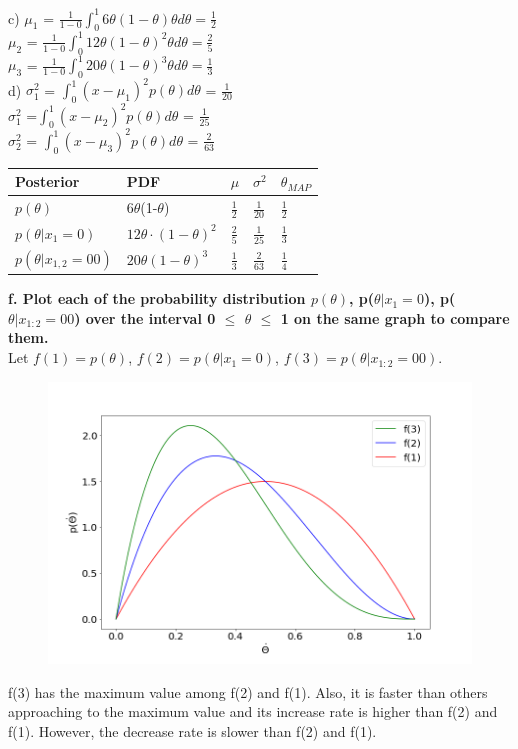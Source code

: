 \documentclass{article}
\begin{document}
c) $\mu_1$ = $\frac{1}{1-0}\int_{0}^{1} 6\theta (1-\theta)\theta d\theta = \frac{1}{2}$\\
$\mu_2$ = $\frac{1}{1-0}\int_{0}^{1} 12\theta (1-\theta)^2 \theta d\theta = \frac{2}{5}$\\
$\mu_3$ = $\frac{1}{1-0}\int_{0}^{1} 20\theta (1-\theta)^3 \theta d\theta = \frac{1}{3}$\\

d) $\sigma^2_1$  = $\int_{0}^{1} (x-\mu_1)^2 p(\theta)d\theta $ = $\frac{1}{20}$\\
$\sigma^2_1$  =$\int_{0}^{1} (x-\mu_2)^2 p(\theta)d\theta $ = $\frac{1}{25}$\\
$\sigma^2_2$ = $\int_{0}^{1} (x-\mu_3)^2 p(\theta)d\theta $ = $\frac{2}{63}$

\begin{table}[]
\centering
\begin{tabular}{|l|l|l|l|l|}

\hline
\textbf{Posterior} & \textbf{PDF} & \textbf{$\mu$} & \textbf{$\sigma^2$} & \textbf{$\theta_{MAP}$} \\ 
\hline
      $p(\theta)$ &  6$\theta$(1-$\theta$)& $\frac{1}{2}$ & $\frac{1}{20}$ & $\frac{1}{2}$ \\
       \hline
      $p(\theta|x_1 = 0)$ & $12\theta\cdot(1-\theta)^2$ & $\frac{2}{5}$ & $\frac{1}{25}$ & $\frac{1}{3}$ \\ 
      \hline
      $p(\theta|x_{1,2} = 00)$ & $20\theta(1-\theta)^3$ & $\frac{1}{3}$ &  $\frac{2}{63}$ &  $\frac{1}{4}$\\
       \hline
\end{tabular}
\end{table}
\textbf{f. Plot each of the probability distribution $p(\theta)$, p($\theta|x_1 = 0$), p($\theta|x_{1:2} =00 $) over the interval 0 $\leq$ $\theta$ $\leq$ 1 on the same graph to compare them.} \\
Let $f(1) = p(\theta)$, $f(2) = p(\theta|x_1 = 0)$, $f(3) = p(\theta | x_{1:2} = 00)$. 
\begin{figure}[H]
\centering
\includegraphics[width = \linewidth]{1.png}
\end{figure}
f(3) has the maximum value among f(2) and f(1). Also, it is faster than others approaching to the maximum value and its increase rate is higher than f(2) and f(1). However, the decrease rate is slower than f(2) and f(1).\\
\end{document}
